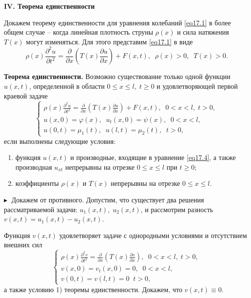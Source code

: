 \textbf{\quad IV. Теорема единственности}

Докажем теорему единственности для уравнения колебаний \eqref{eq17.1} в более общем случае -- когда линейная плотность струны $\rho(x)$ и сила натяжения $T(x)$ могут изменяться. Для этого представим \eqref{eq17.1} в виде 
\begin{equation}\label{eq17.4}
    \rho(x) \frac{\partial ^2 u}{\partial t^2} = \frac{\partial }{\partial x} \left(T(x) \frac{\partial u}{\partial x} \right) + F(x,t),\;\; \rho(x) > 0, \;\; T(x) > 0.
\end{equation}

\textbf{Теорема единственности.} Возможно существование только одной функции $u(x,t)$, определенной в области $0\leq x\leq l, \; t \geq 0$ и удовлетворяющей первой краевой задаче 
$$
\begin{cases}
    \rho(x) \frac{\partial ^2 u}{\partial t^2} = \frac{\partial }{\partial x} \left(T(x) \frac{\partial u}{\partial x} \right) + F(x,t), \;\; 0< x< l,\; t > 0,\\[2mm]
    u(x, 0) = \varphi(x), \;\; u_t(x,0) = \psi(x), \;\; 0< x< l,\\[2mm]
    u(0, t) = \mu_1(t), \;\; u(l, t) = \mu_2(t), \;\; t> 0,
\end{cases}
$$
если выполнены следующие условия:
\begin{enumerate}
    \item функция $u(x,t)$ и производные, входящие в уравнение \eqref{eq17.4}, а также производная $u_{xt}$ непрерывны на отрезке $0 \leq x \leq l$ при $t \geq 0$;
    \item коэффициенты $\rho(x)$ и $T(x)$ непрерывны на отрезке $0 \leq x \leq l$.
\end{enumerate}
$\blacktriangleright\;$ Докажем от противного. 
Допустим, что существует два решения рассматриваемой задачи: $u_1(x,t), \; u_2(x,t)$, и рассмотрим разность $v(x,t) = u_1(x,t) - u_2(x,t)$. 

Функция $v(x,t)$ удовлетворяет задаче с однородными условиями и отсутствием внешних сил
$$
\begin{cases}
    \rho(x) \frac{\partial ^2 v}{\partial t^2} = \frac{\partial }{\partial x} \left(T(x) \frac{\partial v}{\partial x} \right), \;\; 0< x< l,\; t > 0,\\[2mm]
    v(x, 0) = v_t(x,0) = 0, \;\; 0< x< l,\\[2mm]
    v(0, t) = v(l, t) = 0 \;\; t> 0,
\end{cases}
$$
а также условию 1) теоремы единственности. Докажем, что $v(x,t) \equiv 0$. 

